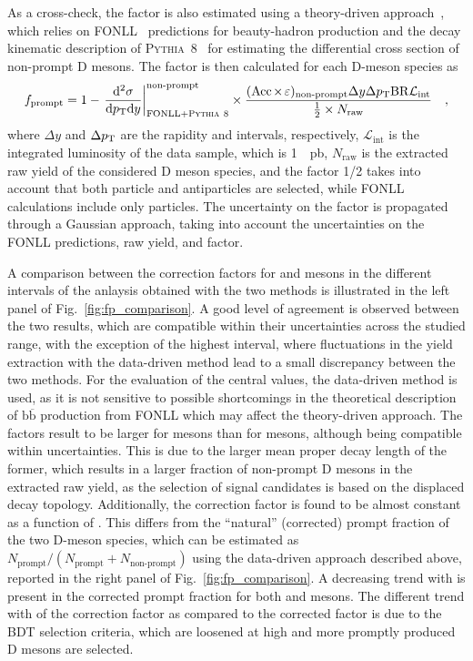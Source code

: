 As a cross-check, the \fp factor is also estimated using a theory-driven approach~\cite{ALICE:2017olh}, which relies on FONLL~\cite{Cacciari:1998it} predictions for beauty-hadron production and the decay kinematic description of \textsc{Pythia~8}~\cite{Bierlich:2022pfr} for estimating the \pt differential cross section of non-prompt D mesons. The \fp factor is then calculated for each D-meson species as 
\begin{equation*}
    f_\mathrm{prompt} = 1-\left.\frac{\mathrm{d}^2\sigma}{\mathrm{d}p_\mathrm{T}\mathrm{d} y}\right\vert_\mathrm{FONLL+\textsc{Pythia}~8}^\mathrm{non\text{-}prompt}\times\frac{(\mathrm{Acc}\mkern-2mu\times\mkern-2mu\varepsilon)_\mathrm{non\text{-}prompt} \Delta y \Delta p_\mathrm{T} \mathrm{BR} \mathcal{L}_\mathrm{int}}{\frac{1}{2}\times N_\mathrm{raw} }\quad ,
\end{equation*}
where $\Delta y$ and $\Delta p_\mathrm{T}$ are the rapidity and \pt intervals, respectively, $\mathcal{L}_\mathrm{int}$ is the integrated luminosity of the data sample, which is \SI{1}{\per\pico\barn}, $N_\mathrm{raw}$ is the extracted raw yield of the considered D meson species, and the factor 1/2 takes into account that both particle and antiparticles are selected, while FONLL calculations include only particles. The uncertainty on the \fp factor is propagated through a Gaussian approach, taking into account the uncertainties on the FONLL predictions, raw yield, and \aeffnp factor. 

A comparison between the \fp correction factors for \ds and \dpl mesons in the different \pt intervals of the anlaysis obtained with the two methods is illustrated in the left panel of Fig.~\ref{fig:fp_comparison}. A good level of agreement is observed between the two results, which are compatible within their uncertainties across the studied \pt range, with the exception of the highest \pt interval, where fluctuations in the yield extraction with the data-driven method lead to a small discrepancy between the two methods. For the evaluation of the central \fp values, the data-driven method is used, as it is not sensitive to possible shortcomings in the theoretical description of $\mathrm{b\overline{b}}$ production from FONLL which may affect the theory-driven approach. The \fp factors result to be larger for \dpl mesons than for \ds mesons, although being compatible within uncertainties. This is due to the larger mean proper decay length of the former, which results in a larger fraction of non-prompt D mesons in the extracted raw yield, as the selection of signal candidates is based on the displaced decay topology. Additionally, the \fp correction factor is found to be almost constant as a function of \pt. This differs from the ``natural'' (corrected) prompt fraction of the two D-meson species, which can be estimated as $N_\mathrm{prompt}/(N_\mathrm{prompt}+N_\mathrm{non\text{-}prompt})$ using the data-driven approach described above, reported in the right panel of Fig.~\ref{fig:fp_comparison}. A decreasing trend with \pt is present in the corrected prompt fraction for both \ds and \dpl mesons. The different trend with \pt of the \fp correction factor as compared to the corrected \fp factor is due to the BDT selection criteria, which are loosened at high \pt and more promptly produced D mesons are selected.

